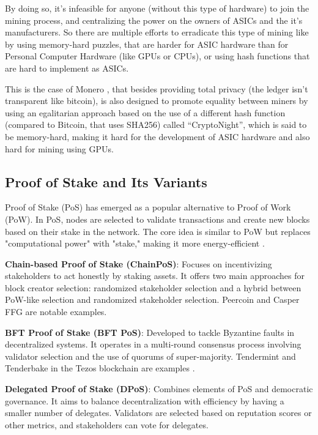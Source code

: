 By doing so, it's infeasible for anyone (without this type of hardware) to join the mining process, and centralizing the power on the owners of ASICs and the it's manufacturers. So there are multiple efforts to erradicate this type of mining like by using memory-hard puzzles, that are harder for ASIC hardware than for Personal Computer Hardware (like GPUs or CPUs), or using hash functions that are hard to implement as ASICs.

This is the case of Monero \cite{getmonero.org}, that besides providing total privacy (the ledger isn't transparent like bitcoin), is also designed to promote equality between miners by using an egalitarian approach based on the use of a different hash function (compared to Bitcoin, that uses SHA256) called ``CryptoNight'', which is said to be memory-hard, making it hard for the development of ASIC hardware and also hard for mining using GPUs. 

\subsection*{\textbf{Proof of Stake and Its Variants}}
Proof of Stake (PoS) has emerged as a popular alternative to Proof of Work (PoW). In PoS, nodes are selected to validate transactions and create new blocks based on their stake in the network. The core idea is similar to PoW but replaces "computational power" with "stake," making it more energy-efficient \cite{reference_needed}.

\textbf{Chain-based Proof of Stake (ChainPoS)}: Focuses on incentivizing stakeholders to act honestly by staking assets. It offers two main approaches for block creator selection: randomized stakeholder selection and a hybrid between PoW-like selection and randomized stakeholder selection. Peercoin \cite{peercoin_foundation} and Casper FFG \cite{buterin2017casper} are notable examples.

\textbf{BFT Proof of Stake (BFT PoS)}: Developed to tackle Byzantine faults in decentralized systems. It operates in a multi-round consensus process involving validator selection and the use of quorums of super-majority. Tendermint and Tenderbake in the Tezos blockchain are examples \cite{lamport2019byzantine}.

\textbf{Delegated Proof of Stake (DPoS)}: Combines elements of PoS and democratic governance. It aims to balance decentralization with efficiency by having a smaller number of delegates. Validators are selected based on reputation scores or other metrics, and stakeholders can vote for delegates.

